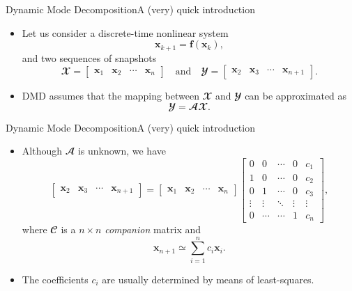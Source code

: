 \documentclass[usenames,dvipsnames,svgnames,10pt,aspectratio=169]{beamer}
\begin{document}
\begin{frame}[t, c]{Dynamic Mode Decomposition}{A (very) quick introduction}
	\begin{itemize}
		\item Let us consider a discrete-time nonlinear system
		$$\mathbf{x}_{k+1} = \bm{f}(\mathbf{x}_k),$$
		and two sequences of snapshots
		$$\mathbfcal{X} = \begin{bmatrix} \mathbf{x}_1 & \mathbf{x}_2 & \cdots & \mathbf{x}_n \end{bmatrix} \quad \text{and} \quad \mathbfcal{Y} = \begin{bmatrix} \mathbf{x}_2 & \mathbf{x}_3 & \cdots & \mathbf{x}_{n+1} \end{bmatrix}.$$

		\bigskip

		\item DMD assumes that the mapping between $\mathbfcal{X}$ and $\mathbfcal{Y}$ can be approximated as
		$$\mathbfcal{Y} = \mathbfcal{A} \mathbfcal{X}.$$
	\end{itemize}

	\vspace{1cm}
\end{frame}

\begin{frame}[t, c]{Dynamic Mode Decomposition}{A (very) quick introduction}
	\begin{itemize}
		\item Although $\mathbfcal{A}$ is unknown, we have
		$$\begin{bmatrix} \mathbf{x}_2 & \mathbf{x}_3 & \cdots & \mathbf{x}_{n+1} \end{bmatrix} = \begin{bmatrix} \mathbf{x}_1 & \mathbf{x}_2 & \cdots & \mathbf{x}_n \end{bmatrix}	\begin{bmatrix}
																	0 & 0 & \cdots & 0 & c_1 \\
																	1 & 0 & \cdots & 0 & c_2 \\
																	0 & 1 & \cdots & 0 & c_3 \\
																	\vdots & \vdots & \ddots & \vdots & \vdots \\
																	0 & \cdots & \cdots & 1 & c_n
																\end{bmatrix},$$
		where $\mathbfcal{C}$ is a $n \times n$ \emph{companion} matrix and
		$$\mathbf{x}_{n+1} \simeq \sum_{i=1}^n c_i \mathbf{x}_i.$$

		\item The coefficients $c_i$ are usually determined by means of least-squares.
	\end{itemize}

	\vspace{1.5cm}
\end{frame}
\end{document}
